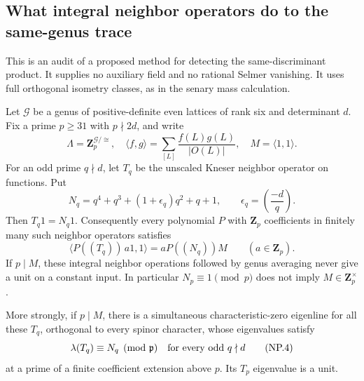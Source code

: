 \subsection{What integral neighbor operators do to the same-genus trace}

This is an audit of a proposed method for detecting the same-discriminant
product.  It supplies no auxiliary field and no rational Selmer vanishing.
It uses full orthogonal isometry classes, as in the senary mass calculation.

\begin{proposition}
Let $\mathcal G$ be a genus of positive-definite even lattices of rank six
and determinant $d$.  Fix a prime $p\geq31$ with $p\nmid2d$, and write
\[
 \Lambda=\mathbf Z_p^{\mathcal G/\cong},\quad
 \langle f,g\rangle=\sum_{[L]}\frac{f(L)g(L)}{|O(L)|},\quad
 M=\langle1,1\rangle.
 \tag{NP.1}
\]
For an odd prime $q\nmid d$, let $T_q$ be the unscaled Kneser neighbor
operator on functions.  Put
\[
 N_q=q^4+q^3+(1+\epsilon_q)q^2+q+1,
 \qquad \epsilon_q=\left(\frac{-d}{q}\right).
 \tag{NP.2}
\]
Then $T_q1=N_q1$.  Consequently every polynomial $P$ with
$\mathbf Z_p$ coefficients in finitely many such neighbor operators satisfies
\[
 \langle P((T_q))\,a1,1\rangle
       =aP((N_q))M\qquad(a\in\mathbf Z_p).
 \tag{NP.3}
\]
If $p\mid M$, these integral neighbor operations followed by genus
averaging never give a unit on a constant input.  In particular
$N_p\equiv1\pmod p$ does not imply $M\in\mathbf Z_p^\times$.

More strongly, if $p\mid M$, there is a simultaneous
characteristic-zero eigenline for all these $T_q$, orthogonal to
every spinor character, whose eigenvalues satisfy
\[
                  \lambda(T_q)\equiv N_q\pmod{\mathfrak p}
                         \quad\hbox{for every odd }q\nmid d
 \tag{NP.4}
\]
at a prime of a finite coefficient extension above $p$.
Its $T_p$ eigenvalue is a unit.
\end{proposition}

